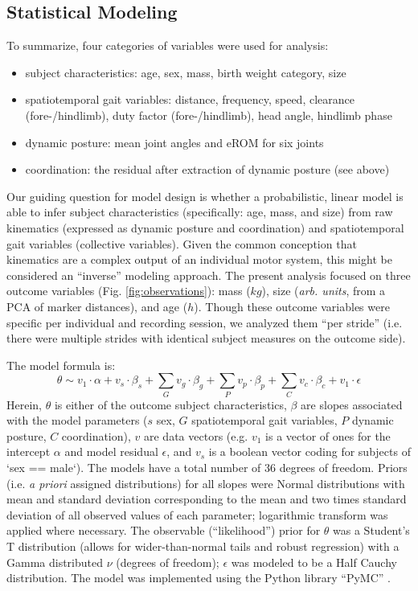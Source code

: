 \subsection{Statistical Modeling}
\label{sec:org7326405}
To summarize, four categories of variables were used for analysis:
\begin{itemize}
\item subject characteristics: age, sex, mass, birth weight category, size
\item spatiotemporal gait variables: distance, frequency, speed, clearance (fore-/hindlimb), duty factor (fore-/hindlimb), head angle, hindlimb phase
\item dynamic posture: mean joint angles and eROM for six joints
\item coordination: the residual after extraction of dynamic posture (see above)
\end{itemize}

Our guiding question for model design is whether a probabilistic, linear model is able to infer subject characteristics (specifically: age, mass, and size) from raw kinematics (expressed as dynamic posture and coordination) and spatiotemporal gait variables (collective variables).
Given the common conception that kinematics are a complex output of an individual motor system, this might be considered an ``inverse'' modeling approach.
The present analysis focused on three outcome variables (Fig. \ref{fig:observations}): mass (\(kg\)), size (\emph{arb. units}, from a PCA of marker distances), and age (\(h\)).
Though these outcome variables were specific per individual and recording session, we analyzed them ``per stride'' (i.e. there were multiple strides with identical subject measures on the outcome side).


The model formula is:
\begin{equation} \theta \sim v_{1}\cdot\alpha + v_{s}\cdot\beta_{s} + \sum\limits_{G} v_{g}\cdot\beta_{g} + \sum\limits_{P}  v_{p}\cdot\beta_{p} +  \sum\limits_{C} v_{c}\cdot\beta_{c} + v_{1}\cdot\epsilon \label{eq:model} \end{equation}
Herein, \(\theta\) is either of the outcome subject characteristics, \(\beta\) are slopes associated with the model parameters (\(s\) sex, \(G\) spatiotemporal gait variables, \(P\) dynamic posture, \(C\) coordination), \(v\) are data vectors (e.g. \(v_{1}\) is a vector of ones for the intercept \(\alpha\) and model residual \(\epsilon\), and \(v_{s}\) is a boolean vector coding for subjects of `sex == male`).
The models have a total number of 36 degrees of freedom.
Priors (i.e. \emph{a priori} assigned distributions) for all slopes were Normal distributions with mean and standard deviation corresponding to the mean and two times standard deviation of all observed values of each parameter; logarithmic transform was applied where necessary.
The observable (``likelihood'') prior for \(\theta\) was a Student's T distribution (allows for wider-than-normal tails and robust regression) with a Gamma distributed \(\nu\) (degrees of freedom); \(\epsilon\) was modeled to be a Half Cauchy distribution.
The model was implemented using the Python library ``PyMC'' \citep[version 4.2.2,][]{Salvatier2016}.


